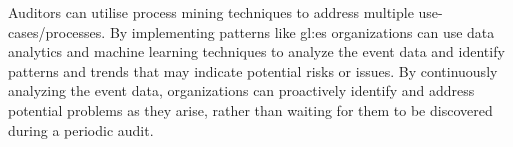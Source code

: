 Auditors can utilise process mining techniques to address multiple use-cases/processes. By implementing patterns like \gls{gl:es} organizations can use data analytics and machine learning techniques to analyze the event data and identify patterns and trends that may indicate potential risks or issues. By continuously analyzing the event data, organizations can proactively identify and address potential problems as they arise, rather than waiting for them to be discovered during a periodic audit.








